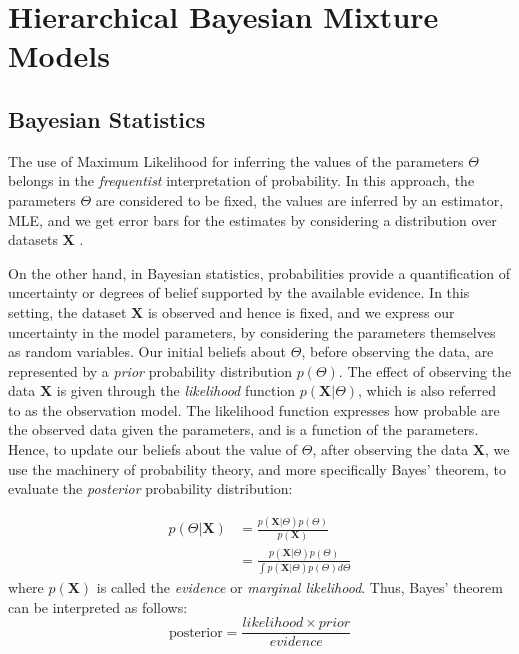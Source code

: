 \section{Hierarchical Bayesian Mixture Models} \label{fdmm-s}

\subsection{Bayesian Statistics}
The use of Maximum Likelihood for inferring the values of the parameters $\Theta$ belongs in the \emph{frequentist} interpretation of probability. In this approach, the parameters $\Theta$ are considered to be fixed, the values are inferred by an estimator, \eg MLE, and we get error bars for the estimates by considering a distribution over datasets $\mathbf{X}$ \cite[Ch. 1]{Bishop2006}. 

On the other hand, in Bayesian statistics, probabilities provide a quantification of uncertainty or degrees of belief supported by the available evidence. In this setting, the dataset $\mathbf{X}$ is observed and hence is fixed, and we express our uncertainty in the model parameters, by considering the parameters themselves as random variables. Our initial beliefs about $\Theta$, before observing the data, are represented by a \emph{prior} probability distribution $p(\Theta)$. The effect of observing the data $\mathbf{X}$ is given through the \emph{likelihood} function $p(\mathbf{X}|\Theta)$, which is also referred to as the observation model.  The likelihood function expresses how probable are the observed data given the parameters, and is a function of the parameters. Hence, to update our beliefs about the value of $\Theta$, after observing the data $\mathbf{X}$, we use the machinery of probability theory, and more specifically Bayes' theorem, to evaluate the \emph{posterior} probability distribution:

\begin{equation}
  \begin{aligned}
	p(\Theta | \mathbf{X}) & = \frac{p(\mathbf{X}|\Theta) p(\Theta)}{p(\mathbf{X})} \\
	& = \frac{p(\mathbf{X}|\Theta) p(\Theta)}{\int p(\mathbf{X}|\Theta) p(\Theta) d\Theta}
  \end{aligned}
\end{equation}
where $p(\mathbf{X})$ is called the \emph{evidence} or \emph{marginal likelihood}. Thus, Bayes' theorem can be interpreted as follows:
\begin{equation}
	\text{posterior} = \frac{likelihood \times prior}{evidence}
\end{equation}

